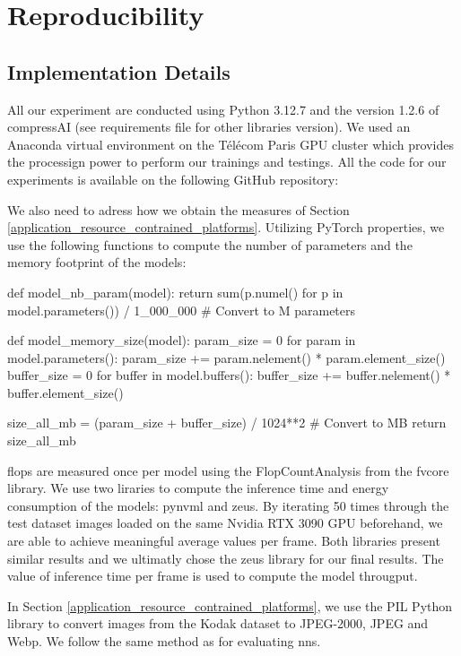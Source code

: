 \appendix

\chapter{Reproducibility}

\section{Implementation Details}
All our experiment are conducted using Python 3.12.7 and the version 1.2.6 of compressAI (see requirements file for other libraries version). We used an Anaconda virtual environment on the Télécom Paris GPU cluster which provides the processign power to perform our trainings and testings. All the code for our experiments is available on the following GitHub repository: \url{}

We also need to adress how we obtain the measures of Section \ref{application_resource_contrained_platforms}. Utilizing PyTorch properties, we use the following functions to compute the number of parameters and the memory footprint of the models:

\begin{pythonCode}
def model_nb_param(model):
    return sum(p.numel() for p in model.parameters()) / 1_000_000 # Convert to M parameters


def model_memory_size(model):
    param_size = 0
    for param in model.parameters():
        param_size += param.nelement() * param.element_size()
    buffer_size = 0
    for buffer in model.buffers():
        buffer_size += buffer.nelement() * buffer.element_size()

    size_all_mb = (param_size + buffer_size) / 1024**2 # Convert to MB
    return size_all_mb
\end{pythonCode}

\acrshort{flop}s are measured once per model using the \textsf{FlopCountAnalysis} from the fvcore library. We use two liraries to compute the inference time and energy consumption of the models: pynvml and zeus. By iterating 50 times through the test dataset images loaded on the same Nvidia RTX 3090 GPU beforehand, we are able to achieve meaningful average values per frame. Both libraries present similar results and we ultimatly chose the zeus library for our final results. The value of inference time per frame is used to compute the model througput.

In Section \ref{application_resource_contrained_platforms}, we use the PIL Python library to convert images from the Kodak dataset to JPEG-2000, JPEG and Webp. We follow the same method as for evaluating \acrshort{nn}s.

